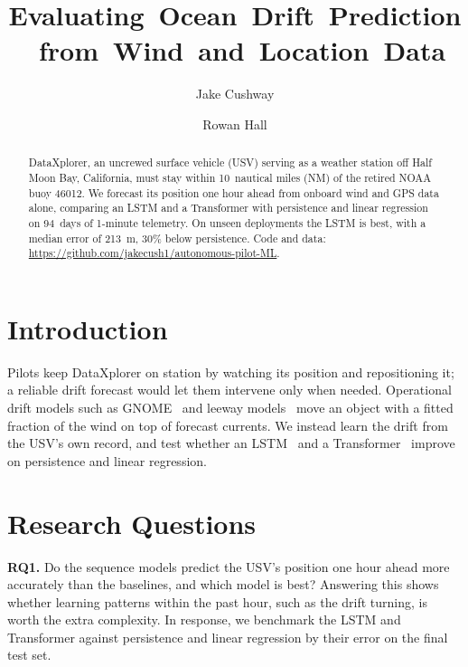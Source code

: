 \documentclass[sigconf]{acmart}
\begin{document}
\title{\mbox{Evaluating Ocean Drift Prediction from Wind and Location Data}}
\author{Jake Cushway}

\author{Rowan Hall}


\begin{abstract}
DataXplorer, an uncrewed surface vehicle (USV) serving as a weather station off Half Moon Bay, California, must stay within 10~nautical miles (NM) of the retired NOAA buoy 46012. We forecast its position one hour ahead from onboard wind and GPS data alone, comparing an LSTM and a Transformer with persistence and linear regression on 94~days of 1-minute telemetry. On unseen deployments the LSTM is best, with a median error of 213~m, 30\% below persistence. Code and data: \url{https://github.com/jakecush1/autonomous-pilot-ML}.
\end{abstract}

\maketitle
\pagestyle{empty}

\section{Introduction}
Pilots keep DataXplorer on station by watching its position and repositioning it; a reliable drift forecast would let them intervene only when needed. Operational drift models such as GNOME~\cite{zelenke2012gnome} and leeway models~\cite{breivik2011leeway} move an object with a fitted fraction of the wind on top of forecast currents. We instead learn the drift from the USV's own record, and test whether an LSTM~\cite{hochreiter1997lstm} and a Transformer~\cite{vaswani2017attention} improve on persistence and linear regression.


\section{Research Questions}
\noindent\textbf{RQ1.} Do the sequence models predict the USV's position one hour ahead more accurately than the baselines, and which model is best? Answering this shows whether learning patterns within the past hour, such as the drift turning, is worth the extra complexity. In response, we benchmark the LSTM and Transformer against persistence and linear regression by their error on the final test set.
\end{document}
